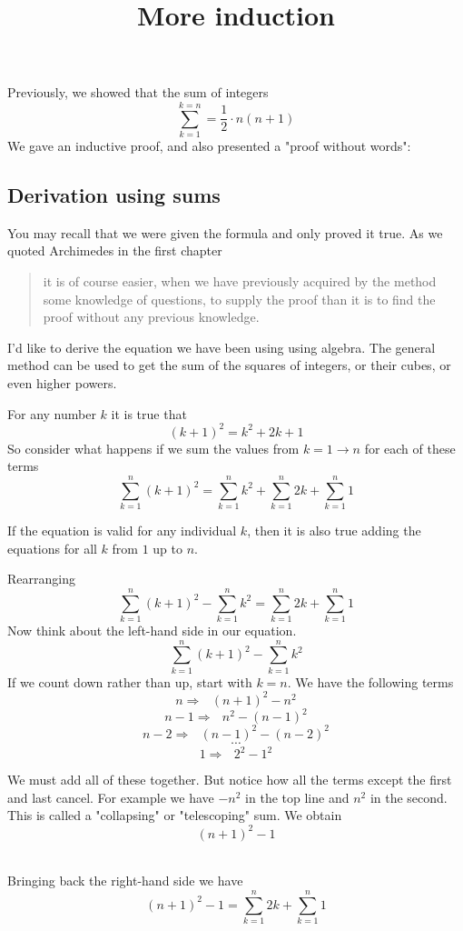 \documentclass[11pt, oneside]{article}
\title{More induction}
\date{}
\begin{document}
\maketitle
\Large

Previously, we showed that the sum of integers
\[ \sum_{k=1}^{k=n} = \frac{1}{2} \cdot n(n+1) \]
We gave an inductive proof, and also presented a "proof without words":

\subsection*{Derivation using sums}
You may recall  that we were given the formula and only proved it true.  As we quoted Archimedes in the first chapter

\begin{quote}it is of course easier, when we have previously acquired by the method some knowledge of questions, to supply the proof than it is to find the proof without any previous knowledge.\end{quote}

I'd like to derive the equation we have been using using algebra.  The general method can be used to get the sum of the squares of integers, or their cubes, or even higher powers.

For any number $k$ it is true that
\[ (k+1)^2 = k^2 + 2k + 1 \]
So consider what happens if we sum the values from $k=1 \rightarrow n$ for each of these terms
\[ \sum_{k=1}^n (k+1)^2 = \sum_{k=1}^n k^2 + \sum_{k=1}^n 2k + \sum_{k=1}^n 1 \]

If the equation is valid for any individual $k$, then it is also true adding the equations for all $k$ from $1$ up to $n$.

Rearranging
\[ \sum_{k=1}^n (k+1)^2 - \sum_{k=1}^n k^2 = \sum_{k=1}^n 2k + \sum_{k=1}^n 1 \]
Now think about the left-hand side in our equation. 
\[ \sum_{k=1}^n (k+1)^2 - \sum_{k=1}^n k^2 \]
If we count down rather than up, start with $k=n$.  We have the following terms
\[ n \Rightarrow \ \ \ (n+1)^2 - n^2 \]
\[ n-1\Rightarrow \ \ \ n^2 - (n-1)^2 \]
\[ n-2 \Rightarrow \ \ \ (n-1)^2 - (n-2)^2 \]
\[ \cdots \]
\[ 1 \Rightarrow \ \ \ 2^2 - 1^2 \]

We must add all of these together.  But notice how all the terms except the first and last cancel.  For example we have $-n^2$ in the top line and $n^2$ in the second. This is called a "collapsing" or "telescoping" sum.  We obtain
\[ (n+1)^2 - 1 \]\

Bringing back the right-hand side  we have
\[ (n+1)^2 - 1 = \sum_{k=1}^n 2k + \sum_{k=1}^n 1 \]
\end{document}

